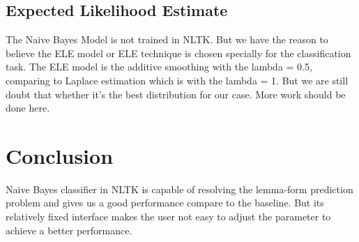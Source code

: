 \documentclass[a4paper]{article}
\begin{document}
\subsection*{Expected Likelihood Estimate}
The Naive Bayes Model is not trained in NLTK. But we have the reason to believe the ELE model or ELE technique is chosen specially for the classification task. 
The ELE model is the additive smoothing with the lambda = 0.5, comparing to Laplace estimation which is with the lambda = 1.
But we are still doubt that whether it's the best distribution for our case. More work should be done here.

\section{Conclusion}
Naive Bayes classifier in NLTK is capable of resolving the lemma-form prediction problem and gives us a good performance compare to the baseline. But its relatively fixed interface makes the user not easy to adjust the parameter to achieve a better performance.





\end{document}
